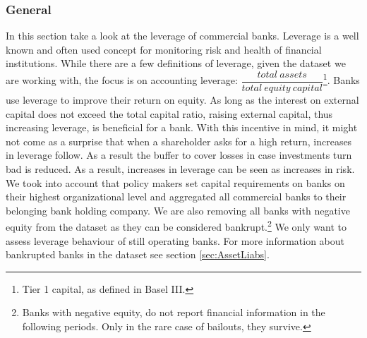 \documentclass[12pt, a4paper]{article} %
\begin{document}
\subsubsection{General}

In this section take a look at the leverage of commercial banks. Leverage is a well known and often used concept for monitoring risk and health of financial institutions. While there are a few definitions of leverage, given the dataset we are working with, the focus is on accounting leverage: $\dfrac{total \: assets}{total \: equity \: capital}$\footnote{Tier 1 capital, as defined in Basel III.}.
 Banks use leverage to improve their return on equity. As long as the interest on external capital does not exceed the total capital ratio, raising external capital, thus increasing leverage, is beneficial for a bank. With this incentive in mind, it might not come as a surprise that when a shareholder asks for a high return, increases in leverage follow. As a result the buffer to cover losses in case investments turn bad is reduced. As a result, increases in leverage can be seen as increases in risk.\\
We took into account that policy makers set capital requirements on banks on their highest organizational level and aggregated all commercial banks to their belonging bank holding company. 
We are also removing all banks with negative equity from the dataset as they can be considered bankrupt.\footnote{Banks with negative equity, do not report financial information in the following periods. Only in the rare case of bailouts, they survive.} We only want to assess leverage behaviour of still operating banks. For more information about bankrupted banks in the dataset see section \ref{sec:AssetLiabs}. 
\end{document}
